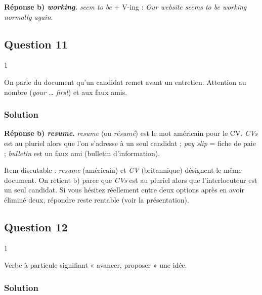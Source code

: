 \documentclass[11pt,a4paper]{article}
\begin{document}
\textbf{Réponse b) \emph{working}.} \emph{seem to be} + V-ing : \emph{Our website seems to be working normally again}.

\hypertarget{question-11}{%
\subsection{Question 11}\label{question-11}}

\begin{indication}{1}

On parle du document qu'un candidat remet avant un entretien. Attention au nombre (\emph{your \ldots{} first}) et aux faux amis.

\end{indication}

\hypertarget{solution-10}{%
\subsubsection{Solution}\label{solution-10}}

\textbf{Réponse b) \emph{resume}.} \emph{resume} (ou \emph{résumé}) est le mot américain pour le CV. \emph{CVs} est au pluriel alors que l'on s'adresse à un seul candidat ; \emph{pay slip} = fiche de paie ; \emph{bulletin} est un faux ami (bulletin d'information).

\begin{piege}

Item discutable : \emph{resume} (américain) et \emph{CV} (britannique) désignent le même document. On retient b) parce que \emph{CVs} est au pluriel alors que l'interlocuteur est un seul candidat. Si vous hésitez réellement entre deux options après en avoir éliminé deux, répondre reste rentable (voir la présentation).

\end{piege}

\hypertarget{question-12}{%
\subsection{Question 12}\label{question-12}}

\begin{indication}{1}

Verbe à particule signifiant « avancer, proposer » une idée.

\end{indication}

\hypertarget{solution-11}{%
\subsubsection{Solution}\label{solution-11}}
\end{document}
